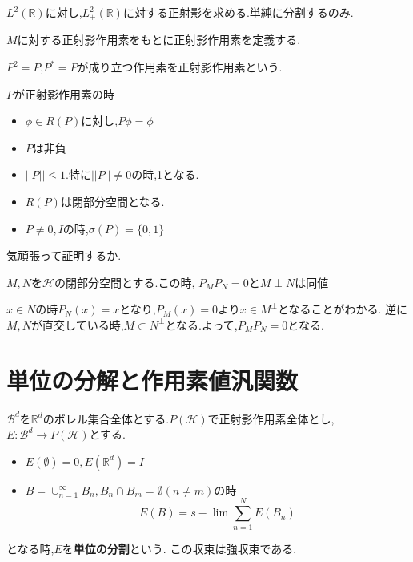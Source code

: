 \documentclass[uplatex]{jsbook}
\begin{document}
\begin{epl}
  $L^2(\mathbb{R})$に対し,$L^2_+(\mathbb{R})$に対する正射影を求める.単純に分割するのみ.
\end{epl}

$M$に対する正射影作用素をもとに正射影作用素を定義する.
\begin{screen}
\begin{dfn}
 $P^2 = P$,$P^* = P$が成り立つ作用素を正射影作用素という.
\end{dfn}
\end{screen}

\begin{prop}
$P$が正射影作用素の時
 \begin{itemize}
   \item $\phi \in R(P)$に対し,$P\phi = \phi$
   \item $P$は非負
   \item $||P|| \le 1$.特に$||P|| \neq 0$の時,1となる.
   \item $R(P)$は閉部分空間となる.
   \item $P \neq 0, I$の時,$\sigma(P) = \{0, 1\}$
 \end{itemize}
\end{prop}
気頑張って証明するか.

\begin{prop}
$M, N$を$\mathcal{H}$の閉部分空間とする.この時,
$P_M P_N = 0$と$M \perp N$は同値
\end{prop}
$x \in N$の時$P_N(x) = x$となり,$P_M(x) = 0$より$x \in M^{\perp}$となることがわかる.
逆に$M, N$が直交している時,$M \subset N^{\perp}$となる.よって,$P_MP_N = 0$となる.

\section{単位の分解と作用素値汎関数}
\begin{screen}
\begin{dfn}
$\mathcal{B}^d$を$\mathbb{R}^d$のボレル集合全体とする.$P(\mathcal{H})$で正射影作用素全体とし,
$E: \mathcal{B}^{d} \to P(\mathcal{H})$とする.
\begin{itemize}
  \item $E(\emptyset) = 0, E(\mathbb{R}^d) = I$
  \item $B = \cup_{n=1}^{\infty} B_n,B_n \cap B_m = \emptyset (n \neq m) $の時
  \begin{equation*}
  E(B) = s- \lim \sum_{n=1}^N E(B_n)
  \end{equation*}
\end{itemize}
となる時,$E$を\textbf{単位の分割}という.
この収束は強収束である.
\end{dfn}
\end{screen}
\end{document}
